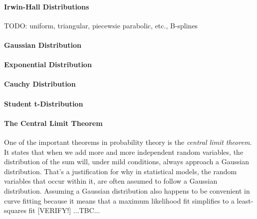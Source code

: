 \paragraph{Irwin-Hall Distributions} TODO: uniform, triangular, piecewsie parabolic, etc., B-splines

\paragraph{Gaussian Distribution}








\paragraph{Exponential Distribution}

\paragraph{Cauchy Distribution}

\paragraph{Student t-Distribution}


\paragraph{The Central Limit Theorem}
One of the important theorems in probability theory is the \emph{central limit theorem}. It states that when we add more and more independent random variables, the distribution of the sum will, under mild conditions, always approach a Gaussian distribution. That's a justification for why in statistical models, the random variables that occur within it, are often assumed to follow a Gaussian distribution. Assuming a Gaussian distribution also happens to be convenient in curve fitting because it means that a maximum likelihood fit simplifies to a least-squares fit [VERIFY!] ...TBC...

